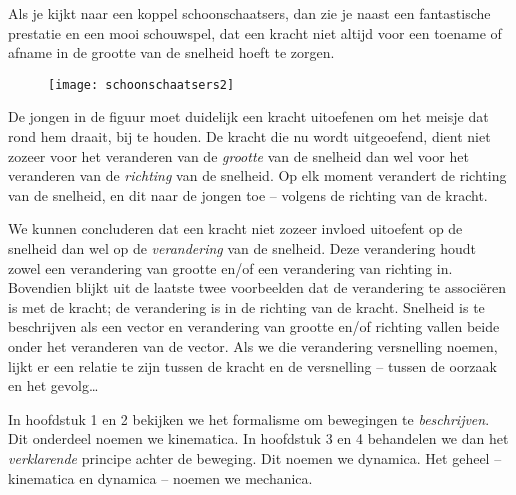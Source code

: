 Als je kijkt naar een koppel schoonschaatsers, dan zie je naast een fantastische prestatie en een mooi schouwspel, dat een kracht niet altijd voor een toename of afname in de grootte van de snelheid hoeft te zorgen. 
\begin{figure}[h]
\centering
\texttt{[image: schoonschaatsers2]}
\end{figure}
De jongen in de figuur moet duidelijk een kracht uitoefenen om het meisje dat rond hem draait, bij te houden. De kracht die nu wordt uitgeoefend, dient niet zozeer voor het veranderen van de \emph{grootte} van de snelheid dan wel voor het veranderen van de \emph{richting} van de snelheid. Op elk moment verandert de richting van de snelheid, en dit naar de jongen toe -- volgens de richting van de kracht.

We kunnen concluderen dat een kracht niet zozeer invloed uitoefent op de snelheid dan wel op de \emph{verandering} van de snelheid. Deze verandering houdt zowel een verandering van grootte en/of een verandering van richting in. Bovendien blijkt uit de laatste twee voorbeelden dat de verandering te associ\"eren is met de kracht; de verandering is in de richting van de kracht. Snelheid is te beschrijven als een vector en verandering van grootte en/of richting vallen beide onder het veranderen van de vector. Als we die verandering versnelling noemen, lijkt er een relatie te zijn tussen de kracht en de versnelling -- tussen de oorzaak en het gevolg\ldots

In hoofdstuk 1 en 2 bekijken we het formalisme om bewegingen te \emph{beschrijven}. Dit onderdeel noemen we kinematica. In hoofdstuk 3 en 4 behandelen we dan het \emph{verklarende} principe achter de beweging. Dit noemen we dynamica. Het geheel -- kinematica en dynamica -- noemen we mechanica.

\clearpage
\newpage